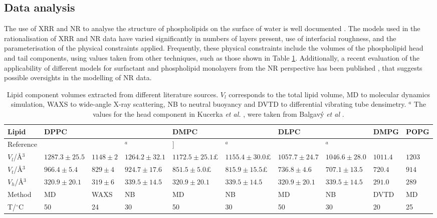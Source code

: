 \documentclass[amsmath,amssymb,twocolumn,superscriptaddress]{revtex4-1}
\begin{document}
\subsection{Data analysis}
%
The use of XRR and NR to analyse the structure of phospholipids on the surface of water is well documented \cite{mohwald_phospholipid_1990,kewalramani_effects_2010,bayerl_specular_1990,johnson_structure_1991,clifton_role_2012,helm_phospholipid_1987,daillant_x-ray_1990}.
The models used in the rationalisation of XRR and NR data have varied significantly in numbers of layers present, use of interfacial roughness, and the parameterisation of the physical constraints applied.
Frequently, these physical constraints include the volumes of the phospholipid head and tail components, using values taken from other techniques, such as those shown in Table \ref{tab:water}.
Additionally, a recent evaluation of the applicability of different models for surfactant and phospholipid monolayers from the NR perspective has been published \cite{campbell_structure_2018}, that suggests possible oversights in the modelling of NR data.
%
\begin{table}
    \caption{\label{tab:water} Lipid component volumes extracted from different literature sources.
  $V_l$ corresponds to the total lipid volume, MD to molecular dynamics simulation, WAXS to wide-angle X-ray scattering, NB to neutral buoyancy and DVTD to differential vibrating tube densimetry. $^a$
  The values for the head component in Kucerka \emph{et al.} \cite{kucerka_determination_2004}, were taken from Balgav\'{y} \emph{et al} \cite{balgavy_evaluation_2001}.}
  \begin{ruledtabular}
    \begin{tabular*}{\textwidth}{l|lll|ll|ll|l|l}
    Lipid & DPPC & & & DMPC & & DLPC & & DMPG & POPG \\
    \hline
    Reference & \cite{armen_phospholipid_1998} & \cite{sun_order_1994} &
    \cite{kucerka_determination_2004,balgavy_evaluation_2001}$^a$ & \cite{armen_phospholipid_1998}] & \cite{kucerka_determination_2004,balgavy_evaluation_2001}$^a$ & \cite{armen_phospholipid_1998} & \cite{kucerka_determination_2004,balgavy_evaluation_2001}$^a$ & \cite{pan_molecular_2012} &
    \cite{kucerka_scattering_2012} \\
    \hline
    $V_l$/\AA$^3$ & $1287.3\pm25.5$ & $1148\pm2$ & $1264.2\pm32.1$ &
    $1172.5\pm25.1£$ & $1155.4\pm30.0£$ & $1057.7\pm24.7$ & $1046.6\pm28.0$ &
    $1011.4$ & $1203$ \\
    $V_t$/\AA$^3$ & $966.4\pm5.4$ & $829\pm4$ & $924.7\pm17.6$ &
    $851.5\pm5.0£$ & $815.9\pm15.5£$ & $736.8\pm4.6$ & $707.1\pm13.5$ &
    $720.4$ & $914$ \\
    $V_h$/\AA$^3$ & $320.9\pm20.1$ & $319\pm6$ & $339.5\pm14.5$ &
    $320.9\pm20.1$ & $339.5\pm14.5$ & $320.9\pm20.1$ & $339.5\pm14.5$ &
    $291.0$ & $289$ \\
    Method & MD & WAXS & NB & MD & NB & MD & NB & DVTD & MD \\
    T/$^\circ$C & 50 & 24 & 30 & 50 & 30 & 50 & 30 & 20 & 25 \\
    \end{tabular*}
  \end{ruledtabular}
\end{table}
%
\end{document}
